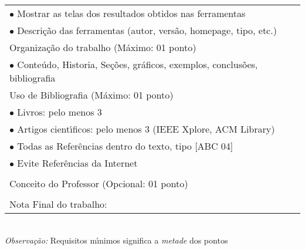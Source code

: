 \begin{tabular}{|p{12cm}|c|}
  $\bullet$  Mostrar as telas dos resultados obtidos nas ferramentas &  \\
  $\bullet$ Descri\c{c}\~{a}o das ferramentas (autor, vers\~{a}o, homepage, tipo, etc.) &  \\
  \hline
  Organiza\c{c}\~{a}o do trabalho (M\'{a}ximo: 01 ponto) &  \\
  $\bullet$ Conte\'{u}do, Historia, Se\c{c}\~{o}es, gr\'{a}ficos, exemplos, conclus\~{o}es, bibliografia &  \\
  \hline
   Uso de Bibliografia (M\'{a}ximo: 01 ponto)&  \\
   $\bullet$ Livros: pelo menos 3&  \\
   $\bullet$ Artigos cient\'{\i}ficos: pelo menos 3 (IEEE Xplore, ACM Library)&  \\
   $\bullet$ Todas as Refer\^{e}ncias dentro do texto, tipo [ABC 04] & \\
   $\bullet$ Evite Refer\^{e}ncias da Internet & \\
   \hline
     &  \\
  Conceito do Professor (Opcional: 01 ponto) & \\
  \hline
   & \\
  \hfill Nota Final do trabalho: & \\
  \hline
\end{tabular}\\
\textit{Observa\c{c}\~{a}o:} Requisitos m\'{\i}nimos significa a \textit{metade} dos pontos
